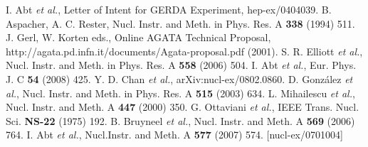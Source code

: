 \begin{thebibliography}{99}
 I. Abt \textit{et al.}, Letter of Intent for GERDA   Experiment, hep-ex/0404039.
 B. Aspacher, A. C.  Rester, Nucl. Instr. and Meth.   in Phys. Res. A \textbf{338} (1994) 511.
J. Gerl, W. Korten eds., Online AGATA Technical   Proposal, http://agata.pd.infn.it/documents/Agata-proposal.pdf   (2001).
 S. R. Elliott \textit{et al.}, Nucl. Instr. and   Meth. in Phys. Res. A \textbf{558} (2006) 504.
 I. Abt \textit{et al.}, Eur. Phys. J. C \textbf{54}   (2008) 425.
 Y. D. Chan \textit{et al.}, arXiv:nucl-ex/0802.0860.
 D. Gonz\'alez \textit{et al.}, Nucl. Instr. and Meth.   in Phys. Res. A \textbf{515} (2003) 634.
 L. Mihailescu \textit{et al.}, Nucl. Instr. and Meth.    A \textbf{447} (2000) 350.
G. Ottaviani \textit{et al.}, IEEE Trans. Nucl. Sci.   \textbf{NS-22} (1975) 192.
 B. Bruyneel \textit{et al.}, Nucl. Instr. and Meth.    A \textbf{569} (2006) 764.
I. Abt \textit{et al.}, Nucl.Instr. and Meth. A \textbf{577} (2007) 574. [nucl-ex/0701004]

\end{thebibliography}

